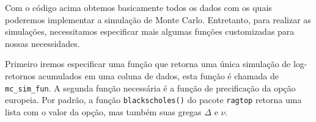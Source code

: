 \documentclass[]{book}
\newenvironment{Shaded}{\begin{snugshade}}{\end{snugshade}}
\newcommand{\CommentTok}[1]{\textcolor[rgb]{0.56,0.35,0.01}{\textit{#1}}}
\newcommand{\ControlFlowTok}[1]{\textcolor[rgb]{0.13,0.29,0.53}{\textbf{#1}}}
\newcommand{\DataTypeTok}[1]{\textcolor[rgb]{0.13,0.29,0.53}{#1}}
\newcommand{\DecValTok}[1]{\textcolor[rgb]{0.00,0.00,0.81}{#1}}
\newcommand{\KeywordTok}[1]{\textcolor[rgb]{0.13,0.29,0.53}{\textbf{#1}}}
\newcommand{\NormalTok}[1]{#1}
\newcommand{\OperatorTok}[1]{\textcolor[rgb]{0.81,0.36,0.00}{\textbf{#1}}}
\newcommand{\StringTok}[1]{\textcolor[rgb]{0.31,0.60,0.02}{#1}}
\theoremstyle{definition}
\theoremstyle{definition}
\theoremstyle{definition}
\theoremstyle{remark}
\begin{document}
Com o código acima obtemos basicamente todos os dados com os quais poderemos implementar a simulação de Monte Carlo. Entretanto, para realizar as simulações, necessitamos especificar mais algumas funções customizadas para nossas necessidades.

Primeiro iremos especificar uma função que retorna uma única simulação de log-retornos acumulados em uma coluna de dados, esta função é chamada de \texttt{mc\_sim\_fun}. A segunda função necessária é a função de precificação da opção europeia. Por padrão, a função \texttt{blackscholes()} do pacote \texttt{ragtop} retorna uma lista com o valor da opção, mas também suas gregas \(\Delta\) e \(\nu\).

\begin{Shaded}
\end{Shaded}
\end{document}
